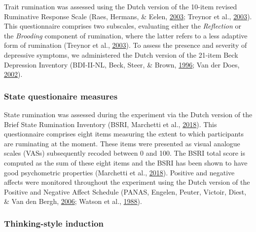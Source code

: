 \documentclass[a4paper,12pt,twoside,onecolumn,openright,final,oldfontcommands]{memoir}
\begin{document}
Trait rumination was assessed using the Dutch version of the 10-item revised Ruminative Response Scale (Raes, Hermans, \& Eelen, \protect\hyperlink{ref-raes_kort_2003}{2003}; Treynor et al., \protect\hyperlink{ref-treynor_rumination_2003}{2003}). This questionnaire comprises two subscales, evaluating either the \emph{Reflection} or the \emph{Brooding} component of rumination, where the latter refers to a less adaptive form of rumination (Treynor et al., \protect\hyperlink{ref-treynor_rumination_2003}{2003}). To assess the presence and severity of depressive symptoms, we administered the Dutch version of the 21-item Beck Depression Inventory (BDI-II-NL, Beck, Steer, \& Brown, \protect\hyperlink{ref-beck_manual_1996}{1996}; Van der Does, \protect\hyperlink{ref-van_der_does_nederlandse_2002}{2002}).

\hypertarget{state-questionaire-measures}{%
\subsubsection{State questionaire measures}\label{state-questionaire-measures}}

State rumination was assessed during the experiment via the Dutch version of the Brief State Rumination Inventory (BSRI, Marchetti et al., \protect\hyperlink{ref-marchetti_brief_2018}{2018}). This questionnaire comprises eight items measuring the extent to which participants are ruminating at the moment. These items were presented as visual analogue scales (VASs) subsequently recoded between 0 and 100. The BSRI total score is computed as the sum of these eight items and the BSRI has been shown to have good psychometric properties (Marchetti et al., \protect\hyperlink{ref-marchetti_brief_2018}{2018}). Positive and negative affects were monitored throughout the experiment using the Dutch version of the Positive and Negative Affect Schedule (PANAS, Engelen, Peuter, Victoir, Diest, \& Van den Bergh, \protect\hyperlink{ref-engelen_verdere_2006}{2006}; Watson et al., \protect\hyperlink{ref-watson_development_1988}{1988}).

\hypertarget{thinking-style-induction}{%
\subsubsection{Thinking-style induction}\label{thinking-style-induction}}
\end{document}
